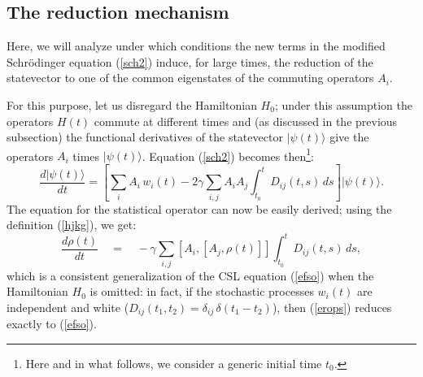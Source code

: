 \documentclass[10pt,a4paper]{article}
\begin{document}
\subsection{The reduction mechanism} \label{nsec3}

Here, we will analyze under which conditions the new terms in the
modified Schr\"odinger equation (\ref{sch2}) induce, for large
times, the reduction of the statevector to one of the common
eigenstates of the commuting operators $A_{i}$.

For this purpose, let us disregard the Hamiltonian $H_{0}$; under
this assumption the operators $H(t)$ commute at different times
and (as discussed in the previous subsection) the functional
derivatives of the statevector $|\psi(t)\rangle$ give the
operators $A_{i}$ times $|\psi(t)\rangle$. Equation (\ref{sch2})
becomes then\footnote{Here and in what follows, we consider a
generic initial time $t_{0}$.}:
\begin{equation}\label{schred}
\frac{d|\psi(t)\rangle}{dt} =  \left[ \sum_{i} A_{i}\, w_{i}(t) -
2\gamma \sum_{i,j}A_{i} A_{j} \int_{t_{0}}^{t} D_{ij}(t,s)\,ds
\right] |\psi(t)\rangle.
\end{equation}
The equation for the statistical operator can now be easily
derived; using the definition (\ref{hjkg}), we get:
\begin{equation} \label{erops}
\frac{d \rho(t)}{dt} \quad = \quad -\gamma \sum_{i,j} \left[
A_{i}, \left[ A_{j}, \rho(t)\right]\right] \int_{t_{0}}^{t}
D_{ij}(t,s)\, ds,
\end{equation}
which is a consistent generalization of the CSL equation
(\ref{efso}) when the Hamiltonian $H_{0}$ is omitted: in fact, if
the stochastic processes $w_{i}(t)$ are independent and white
($D_{ij}(t_{1}, t_{2}) = \delta_{ij}\, \delta(t_{1} - t_{2})$),
then (\ref{erops}) reduces exactly to (\ref{efso}).
\end{document}
